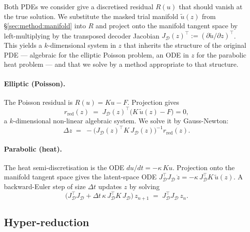 \documentclass{article}
\begin{document}
Both PDEs we consider give a discretised residual $R(u)$ that should
vanish at the true solution. We substitute the masked trial manifold
$\tilde u(z)$ from \S\ref{sec:method:manifold} into $R$ and project
onto the manifold tangent space by left-multiplying by the transposed
decoder Jacobian $J_\mathcal{D}(z)^\top := (\partial \tilde u /
\partial z)^\top$. This yields a $k$-dimensional system in $z$ that
inherits the structure of the original PDE --- algebraic for the
elliptic Poisson problem, an ODE in $z$ for the parabolic heat
problem --- and that we solve by a method appropriate to that
structure.

\paragraph{Elliptic (Poisson).}
The Poisson residual is $R(u) = K u - F$. Projection gives
\begin{equation}
  r_\mathrm{red}(z)
  \;=\; J_\mathcal{D}(z)^\top \bigl(K\, \tilde u(z) - F\bigr) = 0,
  \label{eq:poisson-reduced}
\end{equation}
a $k$-dimensional non-linear algebraic system. We solve it by
Gauss-Newton:
\begin{equation}
  \Delta z \;=\;
  -\bigl(J_\mathcal{D}(z)^\top K\, J_\mathcal{D}(z)\bigr)^{-1}
   r_\mathrm{red}(z).
  \label{eq:poisson-gn}
\end{equation}

\paragraph{Parabolic (heat).}
The heat semi-discretisation is the ODE $du/dt = -\kappa\, K u$.
Projection onto the manifold tangent space gives the latent-space ODE
$J_\mathcal{D}^\top J_\mathcal{D}\, \dot z =
   -\kappa\, J_\mathcal{D}^\top K\, \tilde u(z)$.
A backward-Euler step of size $\Delta t$ updates $z$ by solving
\begin{equation}
  \bigl(J_\mathcal{D}^\top J_\mathcal{D}
        + \Delta t\, \kappa\, J_\mathcal{D}^\top K\, J_\mathcal{D}\bigr)\,
  z_{n+1}
  \;=\; J_\mathcal{D}^\top J_\mathcal{D}\, z_n.
  \label{eq:heat-be}
\end{equation}

\subsection{Hyper-reduction}
\label{sec:method:eq}
\end{document}

